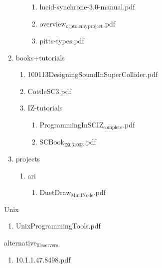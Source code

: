 \documentclass[11pt]{article}
\begin{document}
\begin{enumerate}
\begin{enumerate}
\begin{enumerate}
\item lucid-synchrone-3.0-manual.pdf
\label{sec-1-1-1-1-38-9-1-2-9}

\item overview$_{\text{of}}$$_{\text{ptolemy}}$$_{\text{project}}$.pdf
\label{sec-1-1-1-1-38-9-1-2-10}

\item pitts-types.pdf
\label{sec-1-1-1-1-38-9-1-2-11}
\end{enumerate}
\end{enumerate}

\item books+tutorials
\label{sec-1-1-1-1-38-9-2}
\begin{enumerate}
\item 100113DesigningSoundInSuperCollider.pdf
\label{sec-1-1-1-1-38-9-2-1}

\item CottleSC3.pdf
\label{sec-1-1-1-1-38-9-2-2}

\item IZ-tutorials
\label{sec-1-1-1-1-38-9-2-3}
\begin{enumerate}
\item ProgrammingInSCIZ$_{\text{complete}}$.pdf
\label{sec-1-1-1-1-38-9-2-3-1}

\item SCBook$_{\text{IZ061003}}$.pdf
\label{sec-1-1-1-1-38-9-2-3-2}
\end{enumerate}
\end{enumerate}

\item projects
\label{sec-1-1-1-1-38-9-3}
\begin{enumerate}
\item ari
\label{sec-1-1-1-1-38-9-3-1}
\begin{enumerate}
\item DuetDraw$_{\text{MindNode}}$.pdf
\label{sec-1-1-1-1-38-9-3-1-1}
\end{enumerate}
\end{enumerate}
\end{enumerate}

\item Unix
\label{sec-1-1-1-1-38-10}
\begin{enumerate}
\item UnixProgrammingTools.pdf
\label{sec-1-1-1-1-38-10-1}
\end{enumerate}

\item alternative$_{\text{file}}$$_{\text{servers}}$
\label{sec-1-1-1-1-38-11}
\begin{enumerate}
\item 10.1.1.47.8498.pdf
\label{sec-1-1-1-1-38-11-1}
\end{enumerate}
\end{document}

